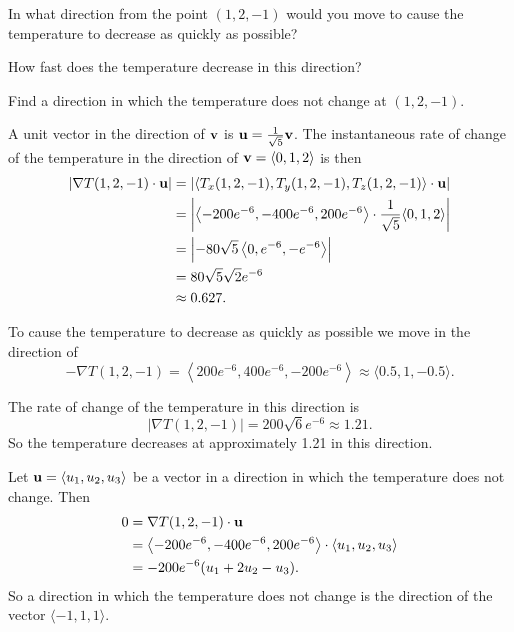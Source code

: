 \begin{exercises}
\item In what direction from the point $(1,2,-1)$ would you move to cause the temperature to
  decrease as quickly as possible?

\item How fast does the temperature decrease in this direction?

\item Find a direction in which the temperature does
  not change at $(1,2,-1)$.

  \ea


\begin{exerciseSolution}
  \ba
\item A unit vector in the direction of $\mathbf{v}$ is $\mathbf{u} = \frac{1}{\sqrt{5}} \mathbf{v}$. The instantaneous rate of change of the temperature in the direction of
  $\mathbf{v}=\langle 0, 1, 2\rangle$ is then
\begin{align*}
\left| \nabla T(1,2,-1) \cdot \mathbf{u} \right| &= \left| \langle T_x(1,2,-1), T_y(1,2,-1), T_z(1,2,-1) \rangle \cdot \mathbf{u} \right| \\
	&= \left| \left\langle -200e^{-6}, -400e^{-6}, 200e^{-6} \right\rangle \cdot \frac{1}{\sqrt{5}} \langle 0,1,2\rangle \right| \\
	&= \left|-80\sqrt{5}\left\langle 0, e^{-6}, -e^{-6} \right\rangle \right| \\
	&= 80\sqrt{5}\sqrt{2}e^{-6} \\
	&\approx 0.627. \\
\end{align*}

\item To cause the temperature to decrease as quickly as possible we move in the direction of 
\[-\nabla T(1,2,-1) = \left\langle 200e^{-6}, 400e^{-6}, -200e^{-6} \right\rangle \approx \langle 0.5, 1, -0.5 \rangle.\]


\item The rate of change of the temperature in this direction is 
\[\left|\nabla T(1,2,-1) \right| =  200 \sqrt{6}e^{-6} \approx 1.21.\]
So the temperature decreases at approximately 1.21 in this direction.

\item Let $\mathbf{u} = \langle u_1, u_2, u_3 \rangle$ be a vector in a direction in which the temperature does not change. Then
\begin{align*}
0 &= \nabla T(1,2,-1) \cdot \mathbf{u} \\
	&= \left\langle -200e^{-6}, -400e^{-6}, 200e^{-6} \right\rangle \cdot \langle u_1, u_2, u_3 \rangle \\
	&= -200e^{-6}(u_1+2u_2-u_3).
\end{align*}
So a direction in which the temperature does not change is the direction of the vector $\langle -1,1,1 \rangle$. 



\end{exerciseSolution}
\end{exercises}
